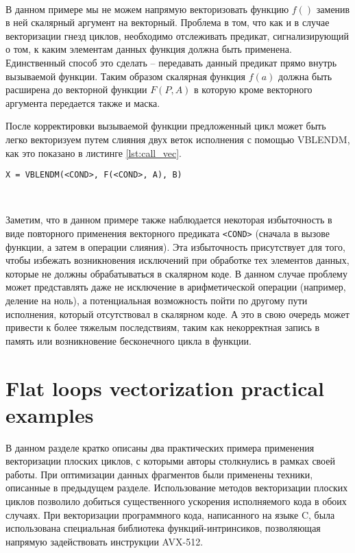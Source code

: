 \documentclass[
11pt,%
tightenlines,%
twoside,%
onecolumn,%
nofloats,%
nobibnotes,%
nofootinbib,%
superscriptaddress,%
noshowpacs,%
centertags]%
{revtex4}
\begin{document}
\

В данном примере мы не можем напрямую векторизовать функцию $f()$ заменив в ней скалярный аргумент на векторный.
Проблема в том, что как и в случае векторизации гнезд циклов, необходимо отслеживать предикат, сигнализирующий о том, к каким элементам данных функция должна быть применена.
Единственный способ это сделать -- передавать данный предикат прямо внутрь вызываемой функции.
Таким образом скалярная функция $f(a)$ должна быть расширена до векторной функции $F(P, A)$ в которую кроме векторного аргумента передается также и маска.

После корректировки вызываемой функции предложенный цикл может быть легко векторизуем путем слияния двух веток исполнения с помощью VBLENDM, как это показано в листинге \ref{lst:call_vec}.

\begin{lstlisting}[caption={Векторизация плоского цикла с вызовом функции под условием},label={lst:call_vec}]
X = VBLENDM(<COND>, F(<COND>, A), B)

\end{lstlisting}

\

Заметим, что в данном примере также наблюдается некоторая избыточность в виде повторного применения векторного предиката \texttt{<COND>} (сначала в вызове функции, а затем в операции слияния).
Эта избыточность присутствует для того, чтобы избежать возникновения исключений при обработке тех элементов данных, которые не должны обрабатываться в скалярном коде.
В данном случае проблему может представлять даже не исключение в арифметической операции (например, деление на ноль), а потенциальная возможность пойти по другому пути исполнения, который отсутствовал в скалярном коде.
А это в свою очередь может привести к более тяжелым последствиям, таким как некорректная запись в память или возникновение бесконечного цикла в функции.

\section{Flat loops vectorization practical examples}

В данном разделе кратко описаны два практических примера применения векторизации плоских циклов, с которыми авторы столкнулись в рамках своей работы.
При оптимизации данных фрагментов были применены техники, описанные в предыдущем разделе.
Использование методов векторизации плоских циклов позволило добиться существенного ускорения исполняемого кода в обоих случаях.
При векторизации программного кода, написанного на языке C, была использована специальная библиотека функций-интринсиков, позволяющая напрямую задействовать инструкции AVX-512.
\end{document}
